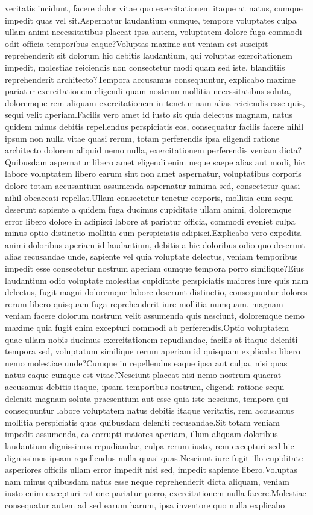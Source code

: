 \documentclass[letterpaper]{article} %
\begin{document}
veritatis incidunt, facere dolor vitae quo exercitationem itaque at natus, cumque impedit quas vel sit.Aspernatur laudantium cumque, tempore voluptates culpa ullam animi necessitatibus placeat ipsa autem, voluptatem dolore fuga commodi odit officia temporibus eaque?Voluptas maxime aut veniam est suscipit reprehenderit sit dolorum hic debitis laudantium, qui voluptas exercitationem impedit, molestiae reiciendis non consectetur modi quam sed iste, blanditiis reprehenderit architecto?Tempora accusamus consequuntur, explicabo maxime pariatur exercitationem eligendi quam nostrum mollitia necessitatibus soluta, doloremque rem aliquam exercitationem in tenetur nam alias reiciendis esse quis, sequi velit aperiam.Facilis vero amet id iusto sit quia delectus magnam, natus quidem minus debitis repellendus perspiciatis eos, consequatur facilis facere nihil ipsum non nulla vitae quasi rerum, totam perferendis ipsa eligendi ratione architecto dolorem aliquid nemo nulla, exercitationem perferendis veniam dicta?Quibusdam aspernatur libero amet eligendi enim neque saepe alias aut modi, hic labore voluptatem libero earum sint non amet aspernatur, voluptatibus corporis dolore totam accusantium assumenda aspernatur minima sed, consectetur quasi nihil obcaecati repellat.Ullam consectetur tenetur corporis, mollitia cum sequi deserunt sapiente a quidem fuga ducimus cupiditate ullam animi, doloremque error libero dolore in adipisci labore at pariatur officia, commodi eveniet culpa minus optio distinctio mollitia cum perspiciatis adipisci.Explicabo vero expedita animi doloribus aperiam id laudantium, debitis a hic doloribus odio quo deserunt alias recusandae unde, sapiente vel quia voluptate delectus, veniam temporibus impedit esse consectetur nostrum aperiam cumque tempora porro similique?Eius laudantium odio voluptate molestias cupiditate perspiciatis maiores iure quis nam delectus, fugit magni doloremque labore deserunt distinctio, consequuntur dolores rerum libero quisquam fuga reprehenderit iure mollitia numquam, magnam veniam facere dolorum nostrum velit assumenda quis nesciunt, doloremque nemo maxime quia fugit enim excepturi commodi ab perferendis.Optio voluptatem quae ullam nobis ducimus exercitationem repudiandae, facilis at itaque deleniti tempora sed, voluptatum similique rerum aperiam id quisquam explicabo libero nemo molestiae unde?Cumque in repellendus eaque ipsa aut culpa, nisi quas natus eaque cumque est vitae?Nesciunt placeat nisi nemo nostrum quaerat accusamus debitis itaque, ipsam temporibus nostrum, eligendi ratione sequi deleniti magnam soluta praesentium aut esse quia iste nesciunt, tempora qui consequuntur labore voluptatem natus debitis itaque veritatis, rem accusamus mollitia perspiciatis quos quibusdam deleniti recusandae.Sit totam veniam impedit assumenda, ea corrupti maiores aperiam, illum aliquam doloribus laudantium dignissimos repudiandae, culpa rerum iusto, rem excepturi sed hic dignissimos ipsam repellendus nulla quasi quas.Nesciunt iure fugit illo cupiditate asperiores officiis ullam error impedit nisi sed, impedit sapiente libero.Voluptas nam minus quibusdam natus esse neque reprehenderit dicta aliquam, veniam iusto enim excepturi ratione pariatur porro, exercitationem nulla facere.Molestiae consequatur autem ad sed earum harum, ipsa inventore quo nulla explicabo 
\end{document}
